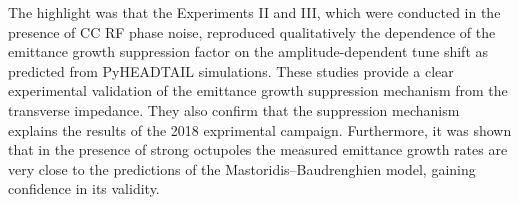 The highlight was that the Experiments II and III, which were conducted in the presence of CC RF phase noise, reproduced qualitatively the dependence of the emittance growth suppression factor on the amplitude-dependent tune shift as predicted from PyHEADTAIL simulations. These studies provide a clear experimental validation of the emittance growth suppression mechanism from the transverse impedance. They also confirm that the suppression mechanism explains the results of the 2018 exprimental campaign. Furthermore, it was shown that in the presence of strong octupoles the measured emittance growth rates are very close to the predictions of the Mastoridis--Baudrenghien model, gaining confidence in its validity. %








